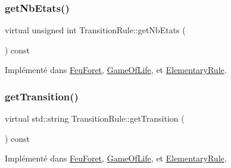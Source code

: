 \mbox{\label{class_transition_rule_ad5bbcc6ef292bb079d8980f00d011a90}} 
\subsubsection{\texorpdfstring{get\+Nb\+Etats()}{getNbEtats()}}
{\footnotesize\ttfamily virtual unsigned int Transition\+Rule\+::get\+Nb\+Etats (\begin{DoxyParamCaption}{ }\end{DoxyParamCaption}) const\hspace{0.3cm}{\ttfamily [pure virtual]}}



Implémenté dans \mbox{\hyperlink{class_feu_foret_a5ad4bbdbb10a73abf63e15698d678bbd}{Feu\+Foret}}, \mbox{\hyperlink{class_game_of_life_afb8e0ee780b7e187266060cf9bec0578}{Game\+Of\+Life}}, et \mbox{\hyperlink{class_elementary_rule_aab53797244e56188202958798458a409}{Elementary\+Rule}}.

\mbox{\label{class_transition_rule_af537bee6cca486c754ee94855242328c}} 
\subsubsection{\texorpdfstring{get\+Transition()}{getTransition()}}
{\footnotesize\ttfamily virtual std\+::string Transition\+Rule\+::get\+Transition (\begin{DoxyParamCaption}{ }\end{DoxyParamCaption}) const\hspace{0.3cm}{\ttfamily [pure virtual]}}



Implémenté dans \mbox{\hyperlink{class_feu_foret_ab793aa05ae4163ac380a6ce1a43ce19c}{Feu\+Foret}}, \mbox{\hyperlink{class_game_of_life_a636421a27cb52e9f7ec161d141809919}{Game\+Of\+Life}}, et \mbox{\hyperlink{class_elementary_rule_aa214ba2de95a61390947a550a39937bb}{Elementary\+Rule}}.

\mbox{\label{class_transition_rule_a2b82a75ef494adc91b28755d55666e7a}} 
